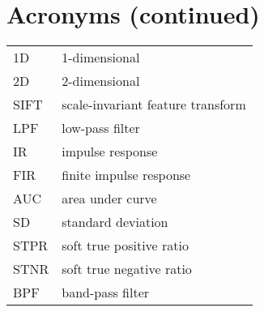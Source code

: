 \section*{Acronyms (continued)}
\begin{tabular}{p{} p{}}

    1D & 1-dimensional \\
    2D & 2-dimensional \\
    SIFT & scale-invariant feature transform \\
    LPF & low-pass filter \\
    IR & impulse response \\
    FIR & finite impulse response \\
    AUC & area under curve \\
    SD & standard deviation \\
    STPR & soft true positive ratio \\
    STNR & soft true negative ratio \\
    BPF & band-pass filter \\

\end{tabular}


